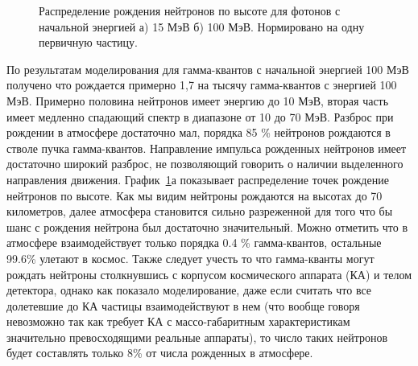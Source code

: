 \begin{figure}[t]
    \begin{center}
        \begin{minipage}[h]{0.49\linewidth}
        \end{minipage}
        \hfill
        \begin{minipage}[h]{0.49\linewidth}
        \end{minipage}
        \caption{Распределение рождения нейтронов по высоте для фотонов с начальной энергией а) 15 МэВ б) 100 МэВ. Нормировано на одну первичную частицу.}
    \end{center}
    \label{fig:storm:neutron_z}
\end{figure}

По результатам моделирования для гамма-квантов с начальной энергией 100 МэВ получено что рождается примерно 1,7 на тысячу гамма-квантов с энергией 100 МэВ. Примерно половина нейтронов имеет энергию до 10 МэВ, вторая часть имеет медленно спадающий спектр в диапазоне от 10 до 70 МэВ. Разброс при рождении в атмосфере достаточно мал, порядка 85 \% нейтронов рождаются в стволе пучка гамма-квантов. Направление импульса рожденных нейтронов имеет достаточно широкий разброс, не позволяющий говорить о наличии выделенного направления движения. График~\ref{fig:storm:neutron_z}а показывает распределение точек рождение нейтронов по высоте. Как мы видим нейтроны рождаются на высотах до 70 километров, далее атмосфера становится сильно разреженной для того что бы шанс с рождения нейтрона был достаточно значительный. Можно отметить что в атмосфере взаимодействует только порядка 0.4 \% гамма-квантов, остальные 99.6\% улетают в космос. Также следует учесть то что гамма-кванты могут рождать нейтроны столкнувшись с корпусом космического аппарата (КА) и телом детектора, однако как показало моделирование, даже если считать что все долетевшие до КА частицы взаимодействуют в нем (что вообще говоря невозможно так как требует КА с массо-габаритным характеристикам значительно превосходящими реальные аппараты), то число таких нейтронов будет составлять только 8\% от числа рожденных в атмосфере.

